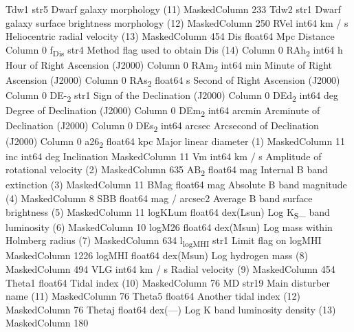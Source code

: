 \documentclass[11pt]{article}
\begin{document}
    Tdw1    str5                                  Dwarf galaxy morphology (11) MaskedColumn   233
    Tdw2    str1               Dwarf galaxy surface brightness morphology (12) MaskedColumn   250
    RVel   int64        km / s               Heliocentric radial velocity (13) MaskedColumn   454
     Dis float64           Mpc                                        Distance       Column     0
   f\textsubscript{Dis}    str4                           Method flag used to obtain Dis (14)       Column     0
   RAh\textsubscript{2}   int64             h                 Hour of Right Ascension (J2000)       Column     0
   RAm\textsubscript{2}   int64           min               Minute of Right Ascension (J2000)       Column     0
   RAs\textsubscript{2} float64             s               Second of Right Ascension (J2000)       Column     0
   DE-\textsubscript{2}    str1                               Sign of the Declination (J2000)       Column     0
   DEd\textsubscript{2}   int64           deg                   Degree of Declination (J2000)       Column     0
   DEm\textsubscript{2}   int64        arcmin                Arcminute of Declination (J2000)       Column     0
   DEs\textsubscript{2}   int64        arcsec                Arcsecond of Declination (J2000)       Column     0
   a26\textsubscript{2} float64           kpc                       Major linear diameter (1) MaskedColumn    11
     inc   int64           deg                                     Inclination MaskedColumn    11
      Vm   int64        km / s            Amplitude of rotational velocity (2) MaskedColumn   635
    AB\textsubscript{2} float64           mag                  Internal B band extinction (3) MaskedColumn    11
    BMag float64           mag                   Absolute B band magnitude (4) MaskedColumn     8
     SBB float64 mag / arcsec2           Average B band surface brightness (5) MaskedColumn    11
 logKLum float64     dex(Lsun)                    Log K\textsubscript{S}\_ band luminosity (6) MaskedColumn    10
  logM26 float64     dex(Msun)             Log mass within Holmberg radius (7) MaskedColumn   634
l\textsubscript{logMHI}    str1                                          Limit flag on logMHI MaskedColumn  1226
  logMHI float64     dex(Msun)                           Log hydrogen mass (8) MaskedColumn   494
     VLG   int64        km / s                             Radial velocity (9) MaskedColumn   454
  Theta1 float64                                              Tidal index (10) MaskedColumn    76
      MD   str19                                      Main disturber name (11) MaskedColumn    76
  Theta5 float64                                      Another tidal index (12) MaskedColumn    76
  Thetaj float64      dex(---)              Log K band luminosity density (13) MaskedColumn   180
\end{document}
